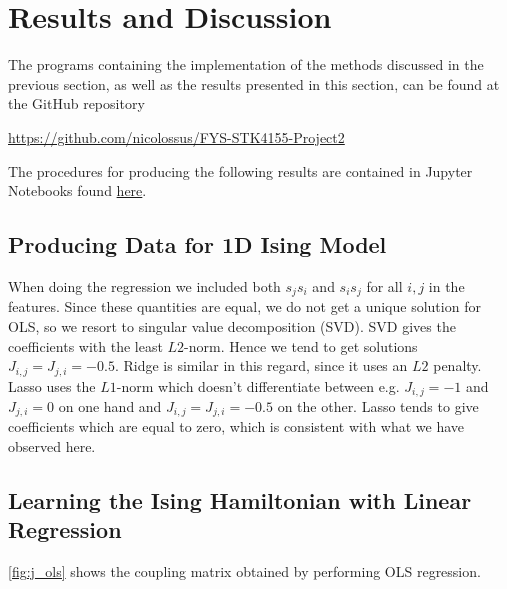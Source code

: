 \section{Results and Discussion}\label{sec:Results}

The programs containing the implementation of the methods discussed in the previous section, as well as the results presented in this section, can be found at the GitHub repository
\begin{center}
    \url{https://github.com/nicolossus/FYS-STK4155-Project2}
\end{center}

The procedures for producing the following results are contained in Jupyter Notebooks found \href{https://github.com/nicolossus/FYS-STK4155-Project2/tree/master/notebooks}{here}.


\subsection{Producing Data for 1D Ising Model}\label{sec:results datagen}

When doing the regression we included both $s_js_i$ and $s_is_j$ for all $i,j$ in the features. Since these quantities are equal, we do not get a unique solution for OLS, so we resort to singular value decomposition (SVD). SVD gives the coefficients with the least $L2$-norm. Hence we tend to get solutions $J_{i,j}=J_{j,i}=-0.5$. Ridge is similar in this regard, since it uses an $L2$ penalty. Lasso uses the $L1$-norm which doesn't differentiate between e.g. $J_{i,j}=-1$ and $J_{j,i} = 0$ on one hand and $J_{i,j}=J_{j,i}=-0.5$ on the other. Lasso tends to give coefficients which are equal to zero, which is consistent with what we have observed here.

\subsection{Learning the Ising Hamiltonian with Linear Regression}\label{sec:results linreg}

\autoref{fig:j_ols} shows the coupling matrix obtained by performing OLS regression.

